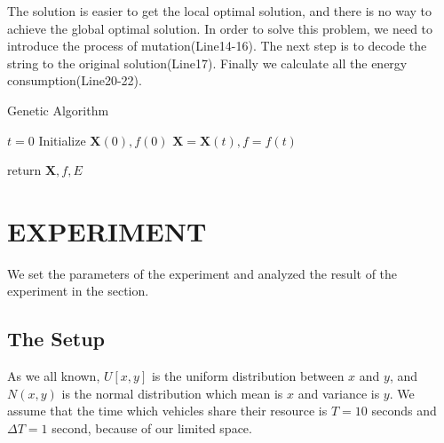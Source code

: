\documentclass[conference]{IEEEtran}
\begin{document}
	The solution is easier to get the local optimal solution, and there is no way to achieve the global optimal solution. In order to solve this problem, we need to introduce the process of mutation(Line14-16). 
	The next step is to decode the string to the original solution(Line17). 
	Finally we calculate all the energy consumption(Line20-22). 
	\begin{algorithm}[t]
		\SetAlgoLined %
		\caption{Genetic Algorithm}%
		\label{genetic}
		$t = 0  $ \;
		Initialize $\mathbf{X}(0), f(0)$  \;
		$\mathbf{X} =\mathbf{X}(t) , f = f(t)$ \;
		
		return $\mathbf{X}, f, E$ 
	\end{algorithm}
	
	\section{EXPERIMENT}
	We set the parameters of the experiment and analyzed the result of the experiment in the section. 
	
	
	\subsection{The Setup}
	As we all known, $U[x,y]$ is the uniform distribution between $x$ and $y$, and $N(x, y)$ is the normal distribution which  mean is $x$ and variance is $y$. 
	We assume that the time which vehicles share their resource is $ T = 10$ seconds and $\Delta T = 1$ second, because of our limited space. 
	
\end{document}
